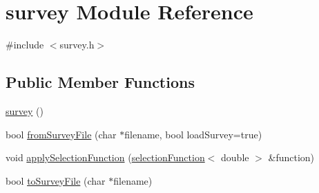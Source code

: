 \hypertarget{modulesurvey}{
\section{survey Module Reference}
\label{modulesurvey}
}


{\ttfamily \#include $<$survey.h$>$}

\subsection*{Public Member Functions}
\begin{DoxyCompactItemize}
\item 
\hyperlink{modulesurvey_a86ebece36d2a27e7fd987af51c49e701}{survey} ()
\item 
bool \hyperlink{modulesurvey_ae0f55914ed9cbf025c736c1eab33ca5a}{fromSurveyFile} (char $\ast$filename, bool loadSurvey=true)
\item 
void \hyperlink{modulesurvey_a9863bbe173e7851032f7dce80e132742}{applySelectionFunction} (\hyperlink{moduleselection_function}{selectionFunction}$<$ double $>$ \&function)
\item 
bool \hyperlink{modulesurvey_ab5972963fd7ffceca5cd23e4af986323}{toSurveyFile} (char $\ast$filename)
\end{DoxyCompactItemize}
